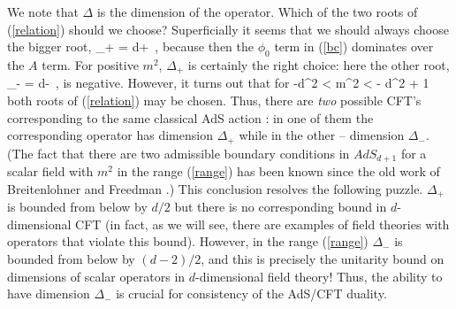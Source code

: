 We note that $\Delta$ is the dimension of the operator.
Which of the two roots of (\ref{relation}) should we choose?
Superficially it seems that we should always choose
the bigger root,
\be
\label{dimen}
\Delta_+ = {d}+\ ,
\ee
because then the $\phi_0$ term in (\ref{bc}) dominates over the
$A$ term. For positive $m^2$, $\Delta_+$ is certainly the right
choice: here the other root, 
\be
\label{otherdimen}
\Delta_- = {d}-\ ,
\ee
is negative. However, it turns out
that for
\be \label{range}
-{d^2} < m^2 < - {d^2} + 1
\ee
both roots of (\ref{relation}) may be chosen. Thus, there are {\it two}
possible CFT's corresponding to the same classical AdS action
\cite{KWnew}:
in one of them the corresponding operator has dimension $\Delta_+$
while in the other -- dimension $\Delta_-$. (The fact that there are
two admissible boundary conditions in $AdS_{d+1}$ for a scalar field
with $m^2$ in the range (\ref{range}) has been known since the old work of
Breitenlohner and Freedman \cite{BF}.) 
This conclusion resolves the following
puzzle. $\Delta_+$ is bounded from below by $d/2$ but there is
no corresponding bound in $d$-dimensional CFT (in fact, as we will see,
there are examples of field theories with operators that violate this
bound). However, in the range (\ref{range}) $\Delta_-$ is bounded
from below by $(d-2)/2$, and this is precisely the unitarity bound
on dimensions of scalar operators
in $d$-dimensional field theory! Thus, the ability to have dimension
$\Delta_-$ is crucial for consistency of the AdS/CFT duality.

